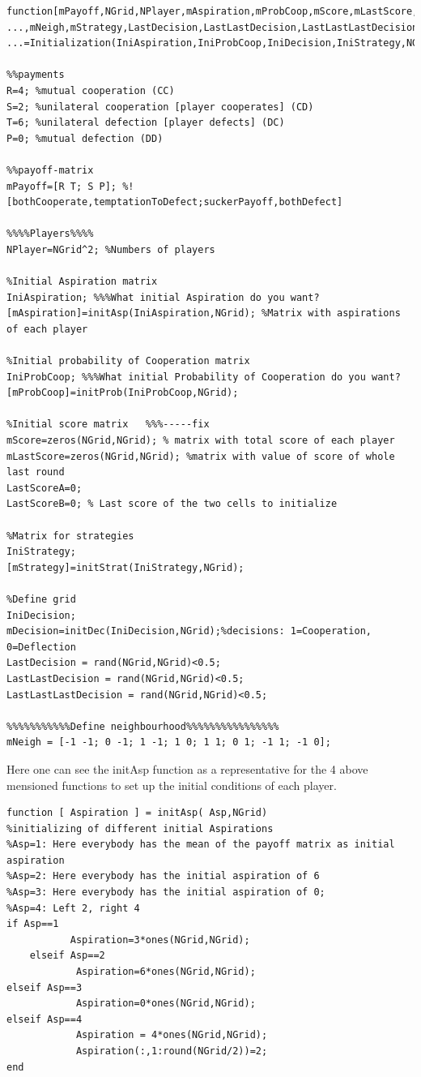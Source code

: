 \documentclass[11pt]{article}
\begin{document}
\begin{verbatim}
function[mPayoff,NGrid,NPlayer,mAspiration,mProbCoop,mScore,mLastScore,mDecision,...
...,mNeigh,mStrategy,LastDecision,LastLastDecision,LastLastLastDecision]=...
...=Initialization(IniAspiration,IniProbCoop,IniDecision,IniStrategy,NGrid)

%%payments
R=4; %mutual cooperation (CC)
S=2; %unilateral cooperation [player cooperates] (CD)
T=6; %unilateral defection [player defects] (DC)
P=0; %mutual defection (DD)

%%payoff-matrix
mPayoff=[R T; S P]; %![bothCooperate,temptationToDefect;suckerPayoff,bothDefect]

%%%%Players%%%%
NPlayer=NGrid^2; %Numbers of players

%Initial Aspiration matrix
IniAspiration; %%%What initial Aspiration do you want? 
[mAspiration]=initAsp(IniAspiration,NGrid); %Matrix with aspirations of each player 

%Initial probability of Cooperation matrix
IniProbCoop; %%%What initial Probability of Cooperation do you want? 
[mProbCoop]=initProb(IniProbCoop,NGrid); 

%Initial score matrix   %%%-----fix
mScore=zeros(NGrid,NGrid); % matrix with total score of each player
mLastScore=zeros(NGrid,NGrid); %matrix with value of score of whole last round
LastScoreA=0;
LastScoreB=0; % Last score of the two cells to initialize

%Matrix for strategies
IniStrategy;
[mStrategy]=initStrat(IniStrategy,NGrid);

%Define grid
IniDecision;
mDecision=initDec(IniDecision,NGrid);%decisions: 1=Cooperation, 0=Deflection
LastDecision = rand(NGrid,NGrid)<0.5;
LastLastDecision = rand(NGrid,NGrid)<0.5;
LastLastLastDecision = rand(NGrid,NGrid)<0.5;

%%%%%%%%%%%Define neighbourhood%%%%%%%%%%%%%%%%
mNeigh = [-1 -1; 0 -1; 1 -1; 1 0; 1 1; 0 1; -1 1; -1 0];
\end{verbatim}

Here one can see the initAsp function as a representative for the 4 above mensioned functions to set up the initial conditions of each player.

\begin{verbatim}
function [ Aspiration ] = initAsp( Asp,NGrid)
%initializing of different initial Aspirations
%Asp=1: Here everybody has the mean of the payoff matrix as initial aspiration
%Asp=2: Here everybody has the initial aspiration of 6
%Asp=3: Here everybody has the initial aspiration of 0;
%Asp=4: Left 2, right 4
if Asp==1
           Aspiration=3*ones(NGrid,NGrid);
    elseif Asp==2
            Aspiration=6*ones(NGrid,NGrid);
elseif Asp==3
            Aspiration=0*ones(NGrid,NGrid);
elseif Asp==4
            Aspiration = 4*ones(NGrid,NGrid);
            Aspiration(:,1:round(NGrid/2))=2;
end
\end{verbatim}
\end{document}
